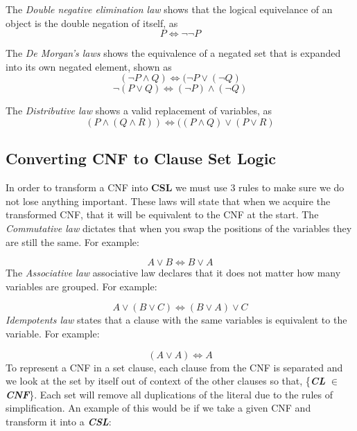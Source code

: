 \documentclass[11pt,a4paper, notitlepage]{report}
\begin{document}
The \emph{Double negative elimination law} shows that the logical equivelance of an object is the double negation of itself, as
\begin{displaymath}
P \Leftrightarrow \neg \neg P
\end{displaymath}

The \emph{De Morgan's laws} shows the equivalence of a negated set that is expanded into its own negated element, shown as
\begin{displaymath}
(\neg P \land Q) \Leftrightarrow (\neg P \lor (\neg Q)
\end{displaymath}
\begin{displaymath}
\neg(P \lor Q) \Leftrightarrow (\neg P) \land (\neg Q)
\end{displaymath}


The \emph{Distributive law} shows a valid replacement of variables, as
\begin{displaymath}
(P \land (Q \land R)) \Leftrightarrow ((P \land Q) \lor (P \lor R)
\end{displaymath}


\subsection{Converting CNF to Clause Set Logic}
\label{subsec:ConvertCNF}

In order to transform a CNF into \textbf{CSL} we must use 3 rules to make sure we do not lose anything important. These laws will state that when we acquire the transformed CNF, that it will be equivalent to the CNF at the start.
The \emph{Commutative law} dictates that when you swap the positions of the variables they are still the same. For example:

\begin{displaymath}
A \lor B \Leftrightarrow B \lor A
\end{displaymath}
The \emph{Associative law} associative law declares that it does not matter how many variables are grouped. For example:

\begin{displaymath}
A \lor (B \lor C) \Leftrightarrow (B \lor A) \lor C
\end{displaymath}
\emph{Idempotents law} states that a clause with the same variables is equivalent to the variable. For example:

\begin{displaymath}
(A \lor A) \Leftrightarrow A
\end{displaymath}
To represent a CNF in a set clause, each clause from the CNF is separated and we look at the set by itself out of context of the other clauses so that, \{\textbf{\textit{CL}} $\in$ \textbf{\textit{CNF}}\}. Each set will remove all duplications of the literal due to the rules of simplification. An example of this would be if we take a given CNF and transform it into a \textbf{\textit{CSL}}:
\end{document}
